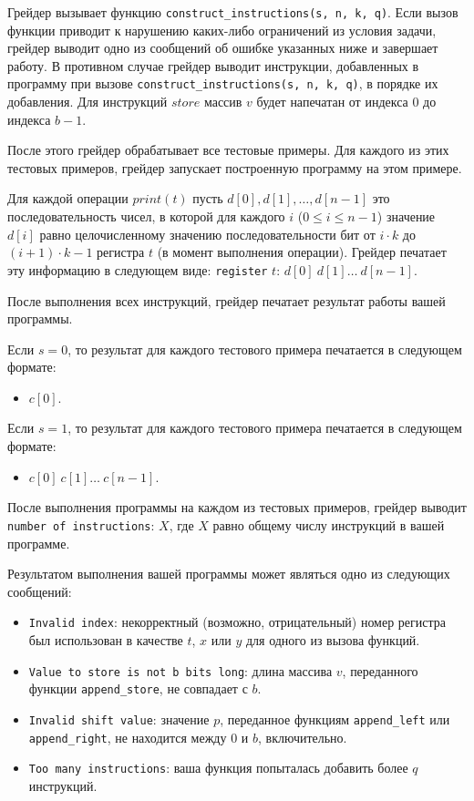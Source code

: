 Грейдер вызывает функцию \texttt{construct\_instructions(s, n, k, q)}. Если вызов функции приводит к нарушению каких-либо ограничений из условия задачи, грейдер выводит одно из сообщений об ошибке указанных ниже и завершает работу.
В противном случае грейдер выводит инструкции, добавленных в программу при вызове \texttt{construct\_instructions(s, n, k, q)}, в порядке их добавления. Для инструкций $store$ массив $v$ будет напечатан от индекса $0$ до индекса $b-1$.

После этого грейдер обрабатывает все тестовые примеры.
Для каждого из этих тестовых примеров, грейдер запускает построенную программу на этом примере.

Для каждой операции $print(t)$ пусть $d[0], d[1], \ldots, d[n-1]$ это последовательность чисел, в которой для каждого $i$ ($0 \leq i \leq n-1$) значение $d[i]$ равно целочисленному значению последовательности бит от $i\cdot k$ до $(i + 1)\cdot k-1$ регистра $t$ (в момент выполнения операции).
Грейдер печатает эту информацию в следующем виде: \texttt{register} $t$: $d[0]\ d[1]\ldots \ d[n-1]$.

После выполнения всех инструкций, грейдер печатает результат работы вашей программы.

Если $s = 0$, то результат для каждого тестового примера печатается в следующем формате:
\begin{itemize}
\item $c[0]$.
\end{itemize}

Если $s = 1$, то результат для каждого тестового примера печатается в следующем формате:
\begin{itemize}
\item $c[0]\ c[1]\ldots \ c[n-1]$.
\end{itemize}

После выполнения программы на каждом из тестовых примеров, грейдер выводит \texttt{number of instructions}: $X$, где $X$ равно общему числу инструкций в вашей программе.


Результатом выполнения вашей программы может являться одно из следующих сообщений:

\begin{itemize}
\item \texttt{Invalid index}: некорректный (возможно, отрицательный) номер регистра был использован в качестве $t$, $x$ или $y$ для одного из вызова функций.
\item \texttt{Value to store is not b bits long}: длина массива $v$, переданного функции  \texttt{append\_store}, не совпадает с $b$.
\item \texttt{Invalid shift value}: значение $p$, переданное функциям \texttt{append\_left} или \texttt{append\_right}, не находится между $0$ и $b$, включительно.
\item \texttt{Too many instructions}: ваша функция попыталась добавить более $q$ инструкций.
\end{itemize}
